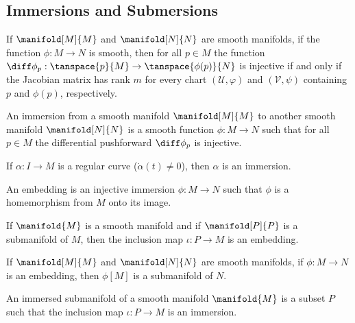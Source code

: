     \subsection{Immersions and Submersions}
        \begin{theorem}
            If $\manifold[M]{M}$ and $\manifold[N]{N}$ are smooth manifolds,
            if the function $\phi:M\rightarrow{N}$ is smooth, then for all
            $p\in{M}$ the function
            $\diff\phi_{p}:\tanspace{p}{M}\rightarrow\tanspace{\phi(p)}{N}$
            is injective if and only if the Jacobian matrix has rank $m$ for
            every chart $(\mathcal{U},\varphi)$ and $(\mathcal{V},\psi)$
            containing $p$ and $\phi(p)$, respectively.
        \end{theorem}
        \begin{definition}
            An immersion from a smooth manifold $\manifold[M]{M}$ to another
            smooth manifold $\manifold[N]{N}$ is a smooth function
            $\phi:M\rightarrow{N}$ such that for all $p\in{M}$ the
            differential pushforward $\diff\phi_{p}$ is injective.
        \end{definition}
        \begin{theorem}
            If $\alpha:I\rightarrow{M}$ is a regular curve
            ($\dot{\alpha}(t)\ne{0}$), then $\alpha$ is an immersion.
        \end{theorem}
        \begin{definition}
            An embedding is an injective immersion $\phi:M\rightarrow{N}$
            such that $\phi$ is a homemorphism from $M$ onto its image.
        \end{definition}
        \begin{theorem}
            If $\manifold{M}$ is a smooth manifold and if $\manifold[P]{P}$
            is a submanifold of $M$, then the inclusion map
            $\iota:P\rightarrow{M}$ is an embedding.
        \end{theorem}
        \begin{theorem}
            If $\manifold[M]{M}$ and $\manifold[N]{N}$ are smooth manifolds,
            if $\phi:M\rightarrow{N}$ is an embedding, then $\phi[M]$ is a
            submanifold of $N$.
        \end{theorem}
        \begin{definition}
            An immersed submanifold of a smooth manifold $\manifold{M}$ is
            a subset $P$ such that the inclusion map $\iota:P\rightarrow{M}$
            is an immersion.
        \end{definition}
